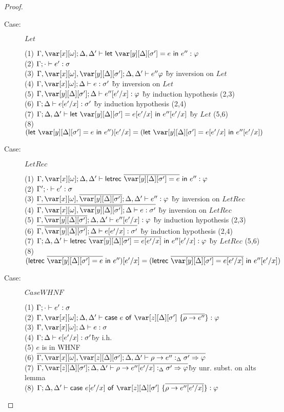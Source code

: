 \begin{proof}
\begin{description}
\item[Case:] $Let$
\begin{tabbing}
    (1) $\G, \xo; \D, \D' \vdash \llet{\yD = e}{e''} : \vp$\\
    (2) $\Gamma; \cdot \vdash e' : \sigma$\\
    (3) $\G,\xo,\yD; \D, \D' \vdash e'' \vp$ \` by inversion on $Let$\\
    (4) $\G,\xo; \D \vdash e : \s'$ \` by inversion on $Let$\\
    (5) $\G,\yD; \D \vdash e''[e'/x] : \vp$ \` by induction hypothesis (2,3)\\
    (6) $\Gamma; \Delta \vdash e[e'/x] : \sigma'$ \` by induction hypothesis (2,4)\\
    (7) $\G;\D,\D' \vdash \llet{\yD = e[e'/x]}{e''[e'/x]}$ \` by $Let$ (5,6)\\
    (8) $(\llet{\yD = e}{e''})[e'/x] = (\llet{\yD = e[e'/x]}{e''[e'/x]})$
\end{tabbing}

\item[Case:] $LetRec$
\begin{tabbing}
    (1) $\G, \xo; \D, \D' \vdash \lletrec{\ov{\yD = e}}{e''} : \vp$\\
    (2) $\Gamma'; \cdot \vdash e' : \sigma$\\
    (3) $\G,\xo,\ov{\yD}; \D, \D' \vdash e'' : \vp$ \` by inversion on $LetRec$\\
    (4) $\ov{\G,\xo, \ov{\yD}; \D \vdash e : \s'}$ \` by inversion on $LetRec$\\
    (5) $\G, \ov{\yD}; \D, \D' \vdash e''[e'/x] : \vp$ \` by induction hypothesis (2,3)\\
    (6) $\ov{\G,\ov{\yD}; \D \vdash e[e'/x] : \s'}$ \` by induction hypothesis (2,4)\\
    (7) $\G; \D, \D' \vdash \lletrec{\ov{\yD = e[e'/x]}}{e''[e'/x]} : \vp$ \` by $LetRec$ (5,6)\\
    (8) $(\lletrec{\ov{\yD = e}}{e''})[e'/x] = (\lletrec{\ov{\yD = e[e'/x]}}{e''[e'/x]})$
\end{tabbing}

\item[Case:] $CaseWHNF$
\begin{tabbing}
    (1) $\Gamma;\cdot \vdash e' : \sigma$\\
    (2) $\G,\xo;\D,\D' \vdash \ccase{e}{\z[\D][\s']~\{\ov{\rho \to e''}\}} : \vp$\\
    (3) $\G,\xo;\D \vdash e :\s$\\
    (4) $\Gamma;\Delta \vdash e [e'/x] : \sigma'$\`by i.h.\\
    (5) $e$ is in WHNF\\
    (6) $\ov{\G,\xo,\z[\D][\s'];\D,\D' \vdash \rho \to e'' :_{\D} \s' \Rightarrow \vp}$\\
    (7) $\ov{\G,\z[\D][\s'];\D,\D' \vdash \rho \to e''[e'/x] :_{\D} \s' \Rightarrow \vp}$\` by unr. subst.  on alts lemma\\
    (8) $\G;\D,\D' \vdash \ccase{e[e'/x]}{\z[\D][\s']~\{\ov{\rho \to e''[e'/x]}\}} : \vp$\\
\end{tabbing}


\end{description}
\end{proof}
